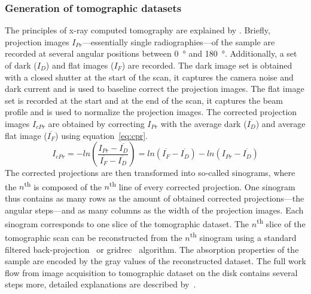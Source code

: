 \subsubsection{Generation of tomographic datasets}
The principles of x-ray computed tomography are explained by \citet{Kak2002}. Briefly, projection images $I_{Pr}$---essentially single radiographies---of the sample are recorded at several angular positions between \SI{0}{\degree} and \SI{180}{\degree}. Additionally, a set of dark ($I_{D}$) and flat images ($I_{F}$) are recorded. The dark image set is obtained with a closed shutter at the start of the scan, it captures the camera noise and dark current and is used to baseline correct the projection images. The flat image set is recorded at the start and at the end of the scan, it captures the beam profile and is used to normalize the projection images. The corrected projection images $I_{cPr}$ are obtained by correcting $I_{Pr}$ with the average dark ($\overline{I_{D}}$) and average flat image ($\overline{I_{F}}$) using equation~\ref{eq:cpr}.
\begin{equation}
	I_{cPr} = -ln\left(\frac{I_{Pr}-\overline{I_{D}}}{\overline{I_{F}}-\overline{I_{D}}}\right)
	        = ln(\overline{I_{F}}-\overline{I_{D}})-ln(I_{Pr}-\overline{I_{D}})
	\label{eq:cpr}
\end{equation}
The corrected projections are then transformed into so-called sinograms, where the $n$\textsuperscript{th} is composed of the $n$\textsuperscript{th} line of every corrected projection. One sinogram thus contains as many rows as the amount of obtained corrected projections---the angular steps---and as many columns as the width of the projection images. Each sinogram corresponds to one slice of the tomographic dataset. The $n$\textsuperscript{th} slice of the tomographic scan can be reconstructed from the $n$\textsuperscript{th} sinogram using a standard filtered back-projection~\cite{Kak2002,Hsieh2003} or gridrec~\cite{Dowd1999} algorithm. The absorption properties of the sample are encoded by the gray values of the reconstructed dataset. The full work flow from image acquisition to tomographic dataset on the disk contains several steps more, detailed explanations are described by~\citet{Hintermueller2009}.

